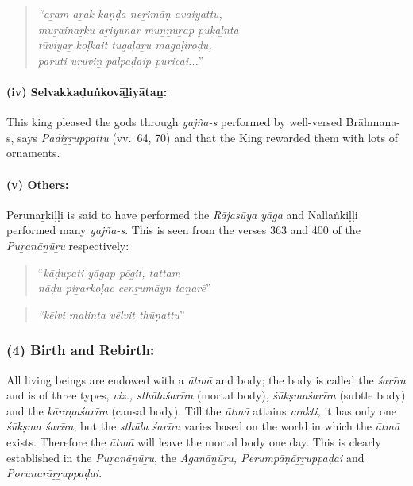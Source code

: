 \begin{quote}
\textit{“aṟam aṟak kaṇḍa neṟimāṇ avaiyattu,}\\\textit{muṟainaṟku aṟiyunar muṉṉuṟap pukaḻnta}\\\textit{tūviyaṟ koḷkait tugaḷaṟu magaḷiroḍu,}\\\textit{paruti uruviṉ palpaḍaip puricai...}”
\end{quote}


\paragraph*{(iv) Selvakkaḍuṅkovāḻiyātaṉ:}

\vskip -7pt

This king pleased the gods through \textit{yajña-s} performed by well-versed Brāhmaṇa-s, says \textit{Padiṟṟuppattu} (vv.~64, 70) and that the King rewarded them with lots of ornaments.


\paragraph*{(v) Others:}

\vskip -7pt

Perunaṟkiḷḷi is said to have performed the \textit{Rājasūya yāga} and Nallaṅkiḷḷi performed many \textit{yajña-s}. This is seen from the verses 363 and 400 of the \textit{Puṟanāṉūṟu} respectively:

\begin{quote}
“\textit{kāḍupati yāgap pōgit, tattam}\\\textit{nāḍu piṟarkoḷac cenṟumāyn taṉarē}”
\end{quote}

\begin{quote}
\textit{“kēlvi malinta vēlvit thūṇattu}”
\end{quote}



\subsubsection*{(4) Birth and Rebirth:}

\vskip -7pt

All living beings are endowed with a \textit{ātmā} and body; the body is called the \textit{śarīra} and is of three types, \textit{viz., sthūlaśarīra} (mortal body), \textit{śūkṣmaśarīra} (subtle body) and the \textit{kāraṇaśarīra} (causal body). Till the \textit{ātmā} attains \textit{mukti,} it has only one \textit{śūkṣma śarīra}, but the \textit{sthūla śarīra} varies based on the world in which the \textit{ātmā} exists. Therefore the \textit{ātmā} will leave the mortal body one day. This is clearly established in the \textit{Puṟanāṉūṟu}, the \textit{Aganāṉūṟu, Perumpāṇāṟṟuppaḍai} and \textit{Porunarāṟṟuppaḍai}.

